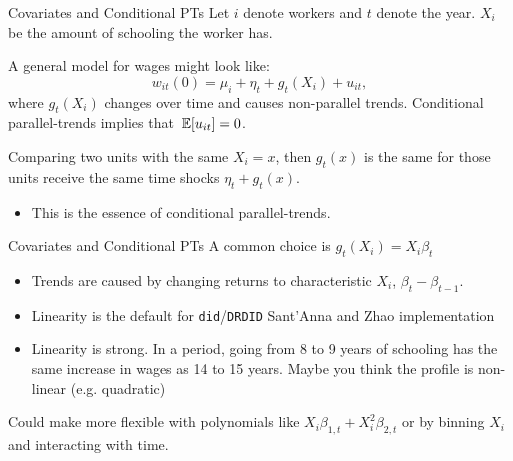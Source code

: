\documentclass[t]{beamer}
\begin{document}
\begin{frame}{Covariates and Conditional PTs}
  Let $i$ denote workers and $t$ denote the year. $X_i$ be the amount of schooling the worker has.

  \bigskip
  A general model for wages might look like: 
  $$
    w_{it}(0) = \mu_i + \eta_t + g_t(X_i)+ u_{it},
  $$ 
  where $g_t(X_i)$ changes over time and causes non-parallel trends. Conditional parallel-trends implies that $\expec{u_{it}} = 0$. 

  \bigskip
  Comparing two units with the same $X_i = x$, then $g_t(x)$ is the same for those units receive the same time shocks $\eta_t + g_t(x)$.
  \begin{itemize}
    \item This is the essence of conditional parallel-trends. 
  \end{itemize}
\end{frame}

\begin{frame}{Covariates and Conditional PTs}
  A common choice is $g_t(X_i) = X_i \beta_t$

  \begin{itemize}    
    \item Trends are caused by changing returns to characteristic $X_i$, $\beta_{t} - \beta_{t-1}$.
    
    
    \item Linearity is the default for \texttt{did}/\texttt{DRDID} Sant'Anna and Zhao implementation
    
    \pause
    \item Linearity is strong. In a period, going from 8 to 9 years of schooling has the same increase in wages as 14 to 15 years. Maybe you think the profile is non-linear (e.g. quadratic)
  \end{itemize}

  \bigskip\pause
  Could make more flexible with polynomials like $X_i \beta_{1,t} + X_i^2 \beta_{2,t}$ or by binning $X_i$ and interacting with time.
\end{frame}
\end{document}
